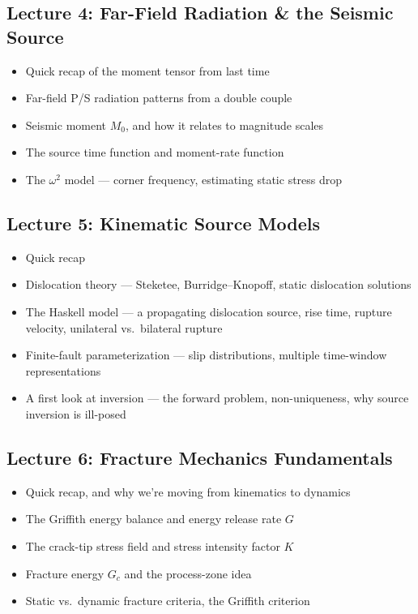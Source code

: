 \subsection*{Lecture 4: Far-Field Radiation \& the Seismic Source}
\begin{itemize}
    \item Quick recap of the moment tensor from last time
    \item Far-field P/S radiation patterns from a double couple
    \item Seismic moment $M_0$, and how it relates to magnitude scales
    
    \item The source time function and moment-rate function
    \item The $\omega^2$ model --- corner frequency, estimating static stress drop
    
\end{itemize}

\subsection*{Lecture 5: Kinematic Source Models}
\begin{itemize}
    \item Quick recap
    \item Dislocation theory --- Steketee, Burridge--Knopoff, static dislocation solutions
    \item The Haskell model --- a propagating dislocation source, rise time, rupture velocity, unilateral vs.\ bilateral rupture
    
    \item Finite-fault parameterization --- slip distributions, multiple time-window representations
    \item A first look at inversion --- the forward problem, non-uniqueness, why source inversion is ill-posed
    
\end{itemize}

\subsection*{Lecture 6: Fracture Mechanics Fundamentals}
\begin{itemize}
    \item Quick recap, and why we're moving from kinematics to dynamics
    \item The Griffith energy balance and energy release rate $G$
    \item The crack-tip stress field and stress intensity factor $K$
    
    \item Fracture energy $G_c$ and the process-zone idea
    \item Static vs.\ dynamic fracture criteria, the Griffith criterion
    
\end{itemize}

